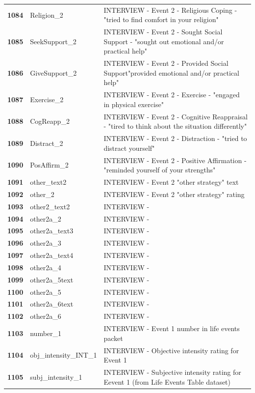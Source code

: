 \documentclass[
  letterpaper,
  DIV=11,
  numbers=noendperiod]{scrartcl}
\begin{document}
\begin{longtable}[t]{>{}cll}
\textbf{1084} & Religion\_2 & INTERVIEW - Event 2 - Religious Coping - "tried to find comfort in your religion"\\
\textbf{1085} & SeekSupport\_2 & INTERVIEW - Event 2 - Sought Social Support - "sought out emotional and/or practical help"\\
\addlinespace
\textbf{1086} & GiveSupport\_2 & INTERVIEW - Event 2 - Provided Social Support"provided emotional and/or practical help"\\
\textbf{1087} & Exercise\_2 & INTERVIEW - Event 2 - Exercise - "engaged in physical exercise"\\
\textbf{1088} & CogReapp\_2 & INTERVIEW - Event 2 - Cognitive Reappraisal - "tired to think about the situation differently"\\
\textbf{1089} & Distract\_2 & INTERVIEW - Event 2 - Distraction - "tried to distract yourself"\\
\textbf{1090} & PosAffirm\_2 & INTERVIEW - Event 2 - Positive Affirmation - "reminded yourself of your strengths"\\
\addlinespace
\textbf{1091} & other\_text2 & INTERVIEW - Event 2 "other strategy" text\\
\textbf{1092} & other\_2 & INTERVIEW - Event 2 "other strategy" rating\\
\textbf{1093} & other2\_text2 & INTERVIEW -\\
\textbf{1094} & other2a\_2 & INTERVIEW -\\
\textbf{1095} & other2a\_text3 & INTERVIEW -\\
\addlinespace
\textbf{1096} & other2a\_3 & INTERVIEW -\\
\textbf{1097} & other2a\_text4 & INTERVIEW -\\
\textbf{1098} & other2a\_4 & INTERVIEW -\\
\textbf{1099} & other2a\_5text & INTERVIEW -\\
\textbf{1100} & other2a\_5 & INTERVIEW -\\
\addlinespace
\textbf{1101} & other2a\_6text & INTERVIEW -\\
\textbf{1102} & other2a\_6 & INTERVIEW -\\
\textbf{1103} & number\_1 & INTERVIEW - Event 1 number in life events packet\\
\textbf{1104} & obj\_intensity\_INT\_1 & INTERVIEW - Objective intensity rating for Event 1\\
\textbf{1105} & subj\_intensity\_1 & INTERVIEW - Subjective intensity rating for Eevent 1 (from Life Events Table dataset)\\

\end{longtable}
\end{document}
